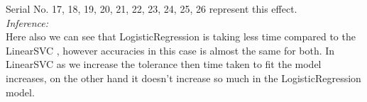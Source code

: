 \documentclass[11 pt]{article}
\begin{document}
{Serial No. 17, 18, 19, 20, 21, 22, 23, 24, 25, 26 represent this effect. 
\\
\emph{Inference: }
\\
Here also we can see that LogisticRegression is taking less time compared to the LinearSVC , however accuracies in this case is almost the same for both. In LinearSVC as we increase the tolerance then time taken to fit the model increases, on the other hand it doesn't increase so much in the LogisticRegression model.

















































}
\end{document}
